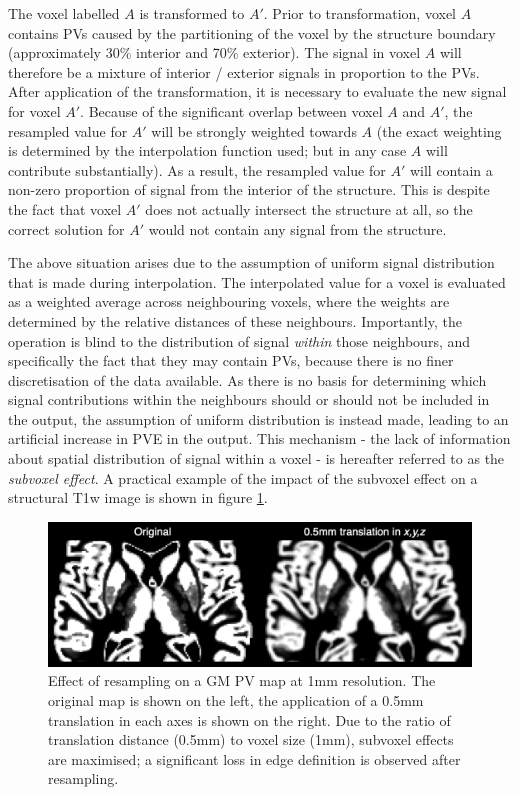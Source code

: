 \documentclass[12pt]{report}
\begin{document}
The voxel labelled $A$ is transformed to $A'$. Prior to transformation, voxel $A$ contains PVs caused by the partitioning of the voxel by the structure boundary (approximately 30\% interior and 70\% exterior). The signal in voxel $A$ will therefore be a mixture of interior / exterior signals in proportion to the PVs. After application of the transformation, it is necessary to evaluate the new signal for voxel $A'$. Because of the significant overlap between voxel $A$ and $A'$, the resampled value for $A'$ will be strongly weighted towards $A$ (the exact weighting is determined by the interpolation function used; but in any case $A$ will contribute substantially). As a result, the resampled value for $A'$ will contain a non-zero proportion of signal from the interior of the structure. This is despite the fact that voxel $A'$ does not actually intersect the structure at all, so the correct solution for $A'$ would not contain any signal from the structure. 

The above situation arises due to the assumption of uniform signal distribution that is made during interpolation. The interpolated value for a voxel is evaluated as a weighted average across neighbouring voxels, where the weights are determined by the relative distances of these neighbours. Importantly, the operation is blind to the distribution of signal \textit{within} those neighbours, and specifically the fact that they may contain PVs, because there is no finer discretisation of the data available. As there is no basis for determining which signal contributions within the neighbours should or should not be included in the output, the assumption of uniform distribution is instead made, leading to an artificial increase in PVE in the output. This mechanism - the lack of information about spatial distribution of signal within a voxel - is hereafter referred to as the \textit{subvoxel effect}. A practical example of the impact of the subvoxel effect on a structural T1w image is shown in figure \ref{translate_data}. 

\begin{figure}
\centering
\includegraphics[width = \textwidth]{translate_data.png}
\caption{Effect of resampling on a GM PV map at 1mm resolution. The original map is shown on the left, the application of a 0.5mm translation in each axes is shown on the right. Due to the ratio of translation distance (0.5mm) to voxel size (1mm), subvoxel effects are maximised; a significant loss in edge definition is observed after resampling.}
\label{translate_data}
\end{figure}
\end{document}
